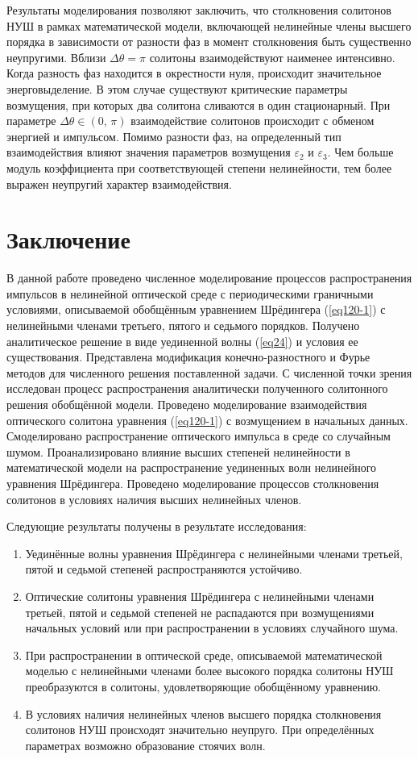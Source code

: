 \documentclass[14pt,a4paper]{extreport}
\begin{document}
			Результаты моделирования позволяют заключить, что столкновения солитонов НУШ в рамках математической модели, включающей нелинейные члены высшего порядка в зависимости от разности фаз в момент столкновения быть существенно неупругими. Вблизи \(\Delta \theta=\pi\) солитоны взаимодействуют наименее интенсивно. Когда разность фаз находится в окрестности нуля, происходит значительное энерговыделение. В этом случае существуют критические параметры возмущения, при которых два солитона сливаются в один стационарный. При параметре \(\Delta\theta\in (0,\,\pi)\) взаимодействие солитонов происходит с обменом энергией и импульсом. Помимо разности фаз, на определенный тип взаимодействия влияют значения параметров возмущения \(\varepsilon_{2}\) и \(\varepsilon_{3}\). Чем больше модуль коэффициента при соответствующей степени нелинейности, тем более выражен неупругий характер взаимодействия.
	
	\section{Заключение}\label{ch400}
		В данной работе проведено численное моделирование процессов распространения импульсов в нелинейной оптической среде с периодическими граничными условиями, описываемой обобщённым уравнением Шрёдингера (\ref{eq120-1}) с нелинейными членами третьего, пятого и седьмого порядков. Получено аналитическое решение в виде уединенной волны (\ref{eq24}) и условия ее существования. Представлена модификация конечно-разностного и Фурье методов для численного решения поставленной задачи. С численной точки зрения исследован процесс распространения аналитически полученного солитонного решения обобщённой модели. Проведено моделирование взаимодействия оптического солитона уравнения (\ref{eq120-1}) с возмущением в начальных данных. Смоделировано распространение оптического импульса в среде со случайным шумом. Проанализировано влияние высших степеней нелинейности в математической модели на распространение уединенных волн нелинейного уравнения Шрёдингера. Проведено моделирование процессов столкновения солитонов в условиях наличия высших нелинейных членов.

		Следующие результаты получены в результате исследования:
		\begin{enumerate}
		\setlength\itemsep{1em}
			\item Уединённые волны уравнения Шрёдингера с нелинейными членами третьей, пятой и седьмой степеней распространяются устойчиво.
			\item Оптические солитоны уравнения Шрёдингера с нелинейными членами третьей, пятой и седьмой степеней не распадаются при возмущениями начальных условий или при распространении в условиях случайного шума.
			\item При распространении в оптической среде, описываемой математической моделью с нелинейными членами более высокого порядка солитоны НУШ преобразуются в солитоны, удовлетворяющие обобщённому уравнению. 
			\item В условиях наличия нелинейных членов высшего порядка столкновения солитонов НУШ происходят значительно неупруго. При определённых параметрах возможно образование стоячих волн.
		\end{enumerate}

	
	
\end{document}
